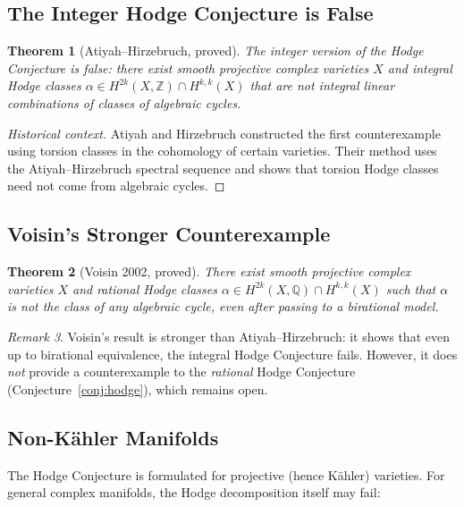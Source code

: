 \documentclass[12pt,a4paper]{amsart}
\newtheorem{theorem}{Theorem}[section]
\theoremstyle{definition}
\theoremstyle{remark}
\newtheorem{remark}[theorem]{Remark}
\begin{document}
\subsection{The Integer Hodge Conjecture is False}

\begin{theorem}[Atiyah–Hirzebruch, proved]
\label{thm:ah-counter}
The integer version of the Hodge Conjecture is false: there exist smooth projective
complex varieties $X$ and integral Hodge classes $\alpha \in H^{2k}(X, \mathbb{Z})
\cap H^{k,k}(X)$ that are not integral linear combinations of classes of
algebraic cycles.
\end{theorem}

\begin{proof}[Historical context]
Atiyah and Hirzebruch \cite{atiyah_hirzebruch1961} constructed the first
counterexample using torsion classes in the cohomology of certain varieties.
Their method uses the Atiyah–Hirzebruch spectral sequence and shows that
torsion Hodge classes need not come from algebraic cycles.
\end{proof}

\subsection{Voisin's Stronger Counterexample}

\begin{theorem}[Voisin 2002, proved]
\label{thm:voisin}
There exist smooth projective complex varieties $X$ and rational Hodge classes
$\alpha \in H^{2k}(X, \mathbb{Q}) \cap H^{k,k}(X)$ such that $\alpha$ is not
the class of any algebraic cycle, even after passing to a birational model.
\end{theorem}

\begin{remark}
Voisin's result \cite{voisin2002} is stronger than Atiyah–Hirzebruch: it shows
that even up to birational equivalence, the integral Hodge Conjecture fails.
However, it does \emph{not} provide a counterexample to the \emph{rational}
Hodge Conjecture (Conjecture~\ref{conj:hodge}), which remains open.
\end{remark}

\subsection{Non-Kähler Manifolds}

The Hodge Conjecture is formulated for projective (hence Kähler) varieties.
For general complex manifolds, the Hodge decomposition itself may fail:
\end{document}
